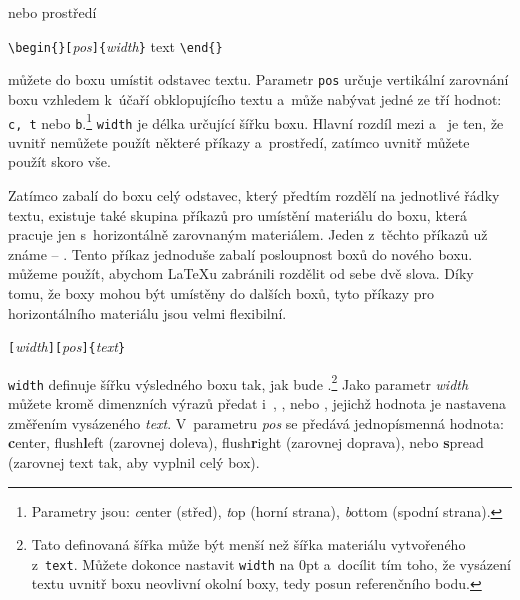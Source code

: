 \noindent nebo prostředí

\begin{lscommand}
\verb|\begin{|\verb|}[|\emph{pos}\verb|]{|\emph{width}\verb|}| text
\verb|\end{|\verb|}|
\end{lscommand}

\noindent můžete do boxu umístit odstavec textu. 
Parametr \texttt{pos} určuje vertikální zarovnání boxu vzhledem k~účaří
obklopujícího textu a~může nabývat jedné
ze tří hodnot: \texttt{c, t} nebo \texttt{b}.\footnote{Parametry jsou: \emph{c}enter (střed),
\emph{t}op (horní strana), \emph{b}ottom (spodní strana).}
\texttt{width} je délka určující šířku boxu. Hlavní rozdíl
mezi  a~ je ten, že uvnitř  nemůžete
použít některé příkazy a~prostředí, zatímco uvnitř  můžete
použít skoro vše.

Zatímco  zabalí do boxu celý odstavec, který předtím rozdělí
na jednotlivé řádky textu, existuje také skupina příkazů pro umístění
materiálu do boxu, která pracuje jen s~horizontálně zarovnaným materiálem.
Jeden z~těchto příkazů už známe -- . Tento příkaz jednoduše zabalí
posloupnost boxů do nového boxu.  můžeme použít, abychom \LaTeX u
zabránili rozdělit od sebe dvě slova. Díky tomu, že boxy mohou být umístěny
do dalších boxů, tyto příkazy pro  horizontálního materiálu
jsou velmi flexibilní.

\begin{lscommand}
\verb|[|\emph{width}\verb|][|\emph{pos}\verb|]{|\emph{text}\verb|}|
\end{lscommand}

\noindent \texttt{width} definuje šířku výsledného boxu tak, jak bude
.\footnote{Tato definovaná šířka může být menší než
šířka materiálu vytvořeného z~\texttt{text}. Můžete dokonce nastavit
\texttt{width} na 0pt a~docílit tím toho,
že vysázení textu uvnitř boxu neovlivní okolní boxy, tedy posun referenčního bodu.} Jako parametr
\emph{width} můžete kromě dimenzních výrazů předat i~, ,
 nebo , jejichž hodnota je nastavena 
změřením vysázeného \emph{text}. V~parametru \emph{pos} se předává
jednopísmenná hodnota: \textbf{c}enter, flush\textbf{l}eft (zarovnej doleva),
flush\textbf{r}ight (zarovnej doprava), nebo \textbf{s}pread (zarovnej
text tak, aby vyplnil celý box).



